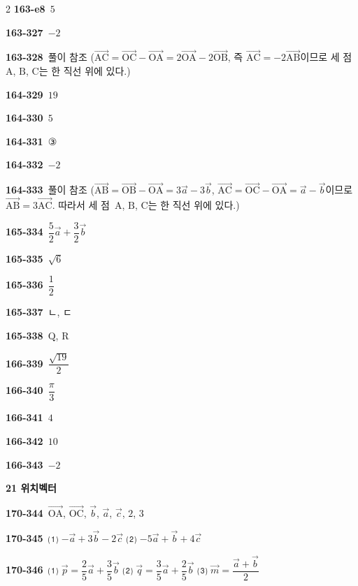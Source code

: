 \documentclass[10pt,a4paper]{article}
\newcommand{\pt}[1]{\mathrm{#1}}
\newcommand{\vecAB}[1]{\overrightarrow{\mathrm{#1}}}
\begin{document}
\begin{multicols}{2}
\noindent\textbf{163-e8}\ $5$\par
\noindent\textbf{163-327}\ $-2$\par
\noindent\textbf{163-328}\ 풀이 참조 ($\overrightarrow{\pt{AC}}=\overrightarrow{\pt{OC}}-\overrightarrow{\pt{OA}}=2\overrightarrow{\pt{OA}}-2\overrightarrow{\pt{OB}}$, 즉 $\overrightarrow{\pt{AC}}=-2\overrightarrow{\pt{AB}}$이므로 세 점~$\pt{A}$, $\pt{B}$, $\pt{C}$는 한 직선 위에 있다.)\par
\noindent\textbf{164-329}\ $19$\par
\noindent\textbf{164-330}\ $5$\par
\noindent\textbf{164-331}\ ③\par
\noindent\textbf{164-332}\ $-2$\par
\noindent\textbf{164-333}\ 풀이 참조 ($\overrightarrow{\pt{AB}}=\overrightarrow{\pt{OB}}-\overrightarrow{\pt{OA}}=3\vec{a}-3\vec{b}$, $\overrightarrow{\pt{AC}}=\overrightarrow{\pt{OC}}-\overrightarrow{\pt{OA}}=\vec{a}-\vec{b}$이므로 $\overrightarrow{\pt{AB}}=3\overrightarrow{\pt{AC}}$. 따라서 세 점~$\pt{A}$, $\pt{B}$, $\pt{C}$는 한 직선 위에 있다.)\par
\noindent\textbf{165-334}\ $\dfrac{5}{2}\vec{a}+\dfrac{3}{2}\vec{b}$\par
\noindent\textbf{165-335}\ $\sqrt{6}$\par
\noindent\textbf{165-336}\ $\dfrac{1}{2}$\par
\noindent\textbf{165-337}\ ㄴ, ㄷ\par
\noindent\textbf{165-338}\ $\pt{Q}$, $\pt{R}$\par
\noindent\textbf{166-339}\ $\dfrac{\sqrt{19}}{2}$\par
\noindent\textbf{166-340}\ $\dfrac{\pi}{3}$\par
\noindent\textbf{166-341}\ $4$\par
\noindent\textbf{166-342}\ $10$\par
\noindent\textbf{166-343}\ $-2$\par
\noindent\textbf{21 위치벡터}\par\smallskip
\noindent\textbf{170-344}\ $\vecAB{OA}$, $\vecAB{OC}$, $\vec{b}$, $\vec{a}$, $\vec{c}$, $2$, $3$\par
\noindent\textbf{170-345}\ ⑴ $-\vec{a}+3\vec{b}-2\vec{c}$ ⑵ $-5\vec{a}+\vec{b}+4\vec{c}$\par
\noindent\textbf{170-346}\ ⑴ $\vec{p}=\dfrac{2}{5}\vec{a}+\dfrac{3}{5}\vec{b}$ ⑵ $\vec{q}=\dfrac{3}{5}\vec{a}+\dfrac{2}{5}\vec{b}$ ⑶ $\vec{m}=\dfrac{\vec{a}+\vec{b}}{2}$\par

\end{multicols}
\end{document}
